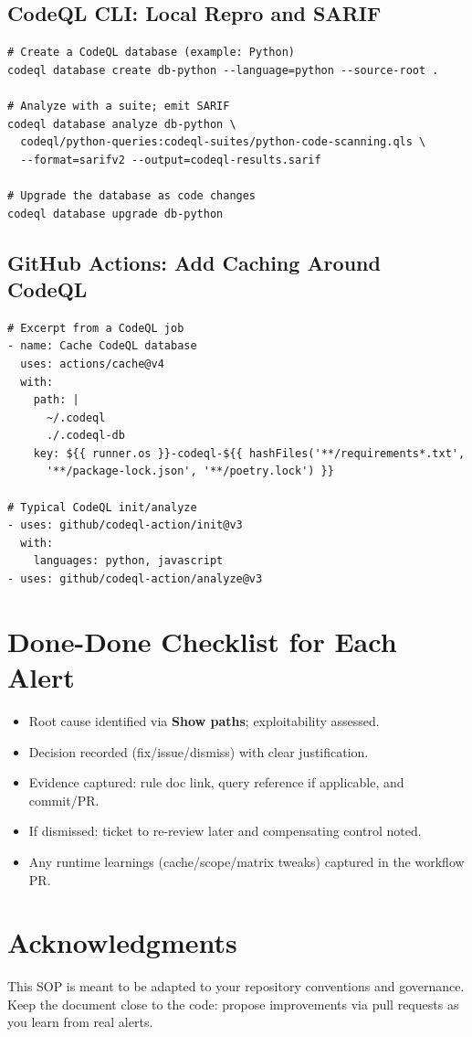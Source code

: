 \documentclass[11pt,letterpaper]{article}
\begin{document}
\subsection{CodeQL CLI: Local Repro and SARIF}
\begin{verbatim}
# Create a CodeQL database (example: Python)
codeql database create db-python --language=python --source-root .

# Analyze with a suite; emit SARIF
codeql database analyze db-python \
  codeql/python-queries:codeql-suites/python-code-scanning.qls \
  --format=sarifv2 --output=codeql-results.sarif

# Upgrade the database as code changes
codeql database upgrade db-python
\end{verbatim}

\subsection{GitHub Actions: Add Caching Around CodeQL}
\begin{verbatim}
# Excerpt from a CodeQL job
- name: Cache CodeQL database
  uses: actions/cache@v4
  with:
    path: |
      ~/.codeql
      ./.codeql-db
    key: ${{ runner.os }}-codeql-${{ hashFiles('**/requirements*.txt',
      '**/package-lock.json', '**/poetry.lock') }}

# Typical CodeQL init/analyze
- uses: github/codeql-action/init@v3
  with:
    languages: python, javascript
- uses: github/codeql-action/analyze@v3
\end{verbatim}

\section{Done-Done Checklist for Each Alert}
\begin{itemize}
  \item Root cause identified via \textbf{Show paths}; exploitability assessed.
  \item Decision recorded (fix/issue/dismiss) with clear justification.
  \item Evidence captured: rule doc link, query reference if applicable, and commit/PR.
  \item If dismissed: ticket to re-review later and compensating control noted.
  \item Any runtime learnings (cache/scope/matrix tweaks) captured in the workflow PR.
\end{itemize}

\section*{Acknowledgments}
This SOP is meant to be adapted to your repository conventions and governance. Keep the document close to the code: propose improvements via pull requests as you learn from real alerts.
\end{document}
